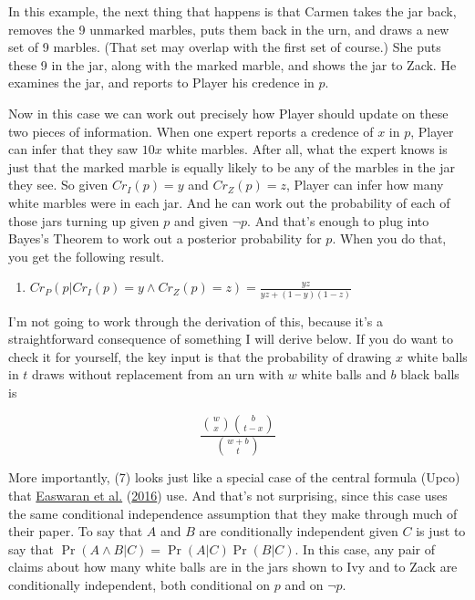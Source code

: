 \documentclass[
  12pt,
]{article}
\providecommand{\tightlist}{%
  \setlength{\itemsep}{0pt}\setlength{\parskip}{0pt}}
\begin{document}
In this example, the next thing that happens is that Carmen takes the
jar back, removes the 9 unmarked marbles, puts them back in the urn, and
draws a new set of 9 marbles. (That set may overlap with the first set
of course.) She puts these 9 in the jar, along with the marked marble,
and shows the jar to Zack. He examines the jar, and reports to Player
his credence in \(p\).

Now in this case we can work out precisely how Player should update on
these two pieces of information. When one expert reports a credence of
\(x\) in \(p\), Player can infer that they saw \(10x\) white marbles.
After all, what the expert knows is just that the marked marble is
equally likely to be any of the marbles in the jar they see. So given
\(Cr_I(p) = y\) and \(Cr_Z(p) = z\), Player can infer how many white
marbles were in each jar. And he can work out the probability of each of
those jars turning up given \(p\) and given \(\neg p\). And that's
enough to plug into Bayes's Theorem to work out a posterior probability
for \(p\). When you do that, you get the following result.

\begin{enumerate}
\def\labelenumi{(\arabic{enumi})}
\setcounter{enumi}{6}
\tightlist
\item
  \(Cr_P(p | Cr_I(p) = y \wedge Cr_Z(p) = z) = \frac{yz}{yz + (1-y)(1-z)}\)
\end{enumerate}

I'm not going to work through the derivation of this, because it's a
straightforward consequence of something I will derive below. If you do
want to check it for yourself, the key input is that the probability of
drawing \(x\) white balls in \(t\) draws without replacement from an urn
with \(w\) white balls and \(b\) black balls is

\[
\frac{\binom{w}{x} \binom{b}{t-x}}{\binom{w+b}{t}}
\]

More importantly, (7) looks just like a special case of the central
formula (Upco) that \protect\hyperlink{ref-EaswaranEtAl2016}{Easwaran et
al.} (\protect\hyperlink{ref-EaswaranEtAl2016}{2016}) use. And that's
not surprising, since this case uses the same conditional independence
assumption that they make through much of their paper. To say that \(A\)
and \(B\) are conditionally independent given \(C\) is just to say that
\(\Pr(A \wedge B | C) = \Pr(A | C)\Pr(B | C)\). In this case, any pair
of claims about how many white balls are in the jars shown to Ivy and to
Zack are conditionally independent, both conditional on \(p\) and on
\(\neg p\).
\end{document}
